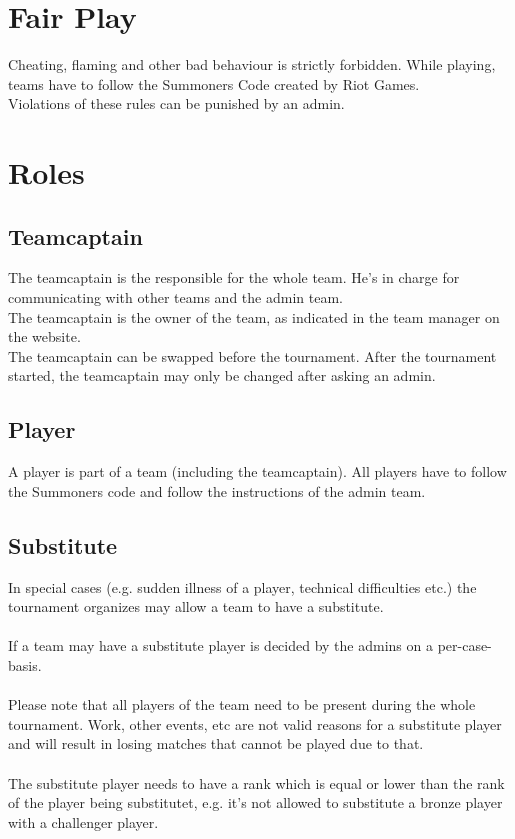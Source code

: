\documentclass{article}
\begin{document}
\section{Fair Play}
Cheating, flaming and other bad behaviour is strictly forbidden. While playing, teams have to follow the Summoners Code created by Riot Games.
\\
Violations of these rules can be punished by an admin.

\section{Roles}
\subsection{Teamcaptain}
The teamcaptain is the responsible for the whole team. He's in charge for communicating with other teams and the admin team.
\\
The teamcaptain is the owner of the team, as indicated in the team manager on the website. 
\\
The teamcaptain can be swapped before the tournament. After the tournament started, the teamcaptain may only be changed after asking an admin.

\subsection{Player}
A player is part of a team (including the teamcaptain). All players have to follow the Summoners code and follow the instructions of the admin team.

\subsection{Substitute}
In special cases (e.g. sudden illness of a player, technical difficulties etc.) the tournament organizes may allow a team to have a substitute.
\\
\\
If a team may have a substitute player is decided by the admins on a per-case-basis.
\\
\\
Please note that all players of the team need to be present during the whole tournament. Work, other events, etc are not valid reasons for a substitute player and will result in losing matches that cannot be played due to that.
\\
\\
The substitute player needs to have a rank which is equal or lower than the rank of the player being substitutet, e.g. it's not allowed to substitute a bronze player with a challenger player.
\end{document}
